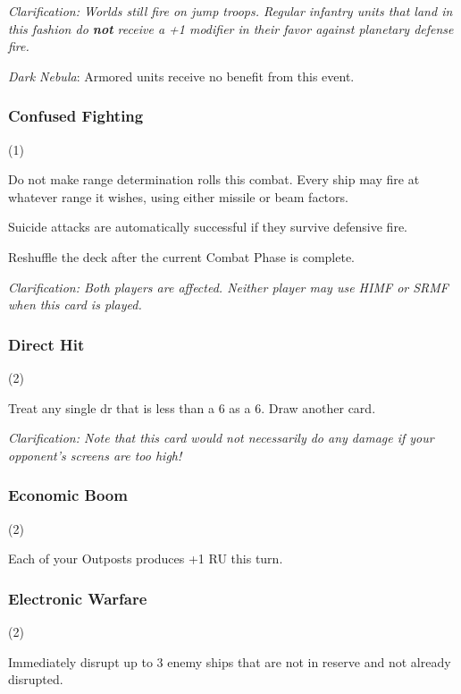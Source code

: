 \documentclass[a4paper,11pt,twocolumn]{article}
\begin{document}
\textit{Clarification: Worlds still fire on jump troops. Regular infantry units that land in this fashion do \textbf{not} receive a +1 modifier in their favor against planetary defense fire.}

\textit{Dark Nebula}: Armored units receive no benefit from this event.

\subsubsection{Confused Fighting} (1)


Do not make range determination rolls this combat. Every ship may fire at whatever range it wishes, using either missile or beam factors.

Suicide attacks are automatically successful if they survive defensive fire.

Reshuffle the deck after the current Combat Phase is complete.

\textit{Clarification: Both players are affected. Neither player may use HIMF or SRMF when this card is played.}

\subsubsection{Direct Hit} (2)


Treat any single dr that is less than a 6 as a 6. Draw another card.

\textit{Clarification: Note that this card would not necessarily do any damage if your opponent's screens are too high!}

\subsubsection{Economic Boom} (2)


Each of your Outposts produces +1 RU this turn.

\subsubsection{Electronic Warfare} (2)


Immediately disrupt up to 3 enemy ships that are not in reserve and not already disrupted.
\end{document}
